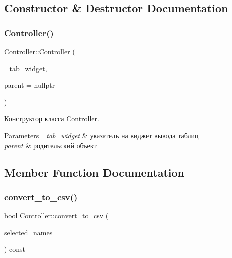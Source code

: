 \subsection{Constructor \& Destructor Documentation}
\mbox{\label{class_controller_a2911be3c6cf58c8525aa63d804488b6a}} 
\subsubsection{\texorpdfstring{Controller()}{Controller()}}
{\footnotesize\ttfamily Controller\+::\+Controller (\begin{DoxyParamCaption}\item[{Q\+Tab\+Widget $\ast$}]{\+\_\+tab\+\_\+widget,  }\item[{Q\+Object $\ast$}]{parent = {\ttfamily nullptr} }\end{DoxyParamCaption})\hspace{0.3cm}{\ttfamily [explicit]}}



Конструктор класса \mbox{\hyperlink{class_controller}{Controller}}. 


\begin{DoxyParams}{Parameters}
{\em \+\_\+tab\+\_\+widget} & указатель на виджет вывода таблиц \\
\hline
{\em parent} & родительский объект \\
\hline
\end{DoxyParams}


\subsection{Member Function Documentation}
\mbox{\label{class_controller_a07bd206b7ca5fec8c3a6fb093ed9b307}} 
\subsubsection{\texorpdfstring{convert\+\_\+to\+\_\+csv()}{convert\_to\_csv()}}
{\footnotesize\ttfamily bool Controller\+::convert\+\_\+to\+\_\+csv (\begin{DoxyParamCaption}\item[{const Q\+String\+List \&}]{selected\+\_\+names }\end{DoxyParamCaption}) const}



